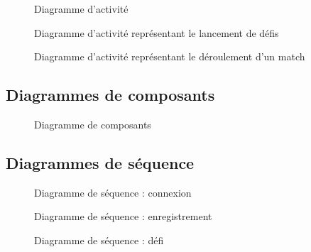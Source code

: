 \documentclass[a4paper]{report}
\begin{document}
\begin{figure}[H]
    \caption{Diagramme d'activité}
\end{figure}

\begin{figure}[H]
    \caption{\label{3} Diagramme d'activité représentant le lancement de défis}
\end{figure}

\begin{figure}[H]
    \caption{\label{3} Diagramme d'activité représentant le déroulement d'un match}
\end{figure}

\subsection{Diagrammes de composants}

\begin{figure}[H]
    \caption{Diagramme de composants}
\end{figure}

\subsection{Diagrammes de séquence}

\begin{figure}[H]
    \caption{Diagramme de séquence : connexion}
\end{figure}


\begin{figure}[H]
    \caption{Diagramme de séquence : enregistrement}
\end{figure}

\begin{figure}[H]
    \caption{Diagramme de séquence : défi}
\end{figure}
\end{document}
